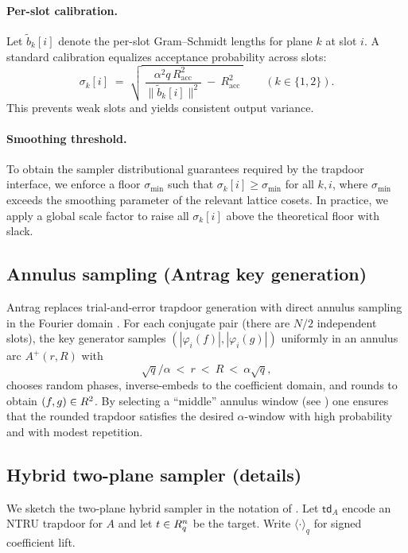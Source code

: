 \paragraph{Per-slot calibration.}
Let \(\widetilde{b}_k[i]\) denote the per-slot Gram--Schmidt lengths for plane \(k\) at slot \(i\). A standard
calibration equalizes acceptance probability across slots:
\[
  \sigma_k[i]
  \;=\;
  \sqrt{\ \frac{\alpha^2 q\,R_{\mathrm{acc}}^2}{\|\widetilde{b}_k[i]\|^2}\ -\ R_{\mathrm{acc}}^2\ }
  \qquad(k\in\{1,2\}).
\]
This prevents weak slots and yields consistent output variance.

\paragraph{Smoothing threshold.}
To obtain the sampler distributional guarantees required by the trapdoor interface, we enforce a floor \(\sigma_{\min}\) such that \(\sigma_k[i]\ge \sigma_{\min}\) for all
\(k,i\), where \(\sigma_{\min}\) exceeds the smoothing parameter of the relevant lattice cosets. In practice, we apply a
global scale factor to raise all \(\sigma_k[i]\) above the theoretical floor with slack.

\subsection{Annulus sampling (Antrag key generation)}
\label{subsec:antrag}
Antrag replaces trial-and-error trapdoor generation with direct annulus sampling in the Fourier domain
\cite{EPRINT:ENSTW23}. For each conjugate pair (there are \(N/2\) independent slots), the key generator samples
\((|\varphi_i(f)|,|\varphi_i(g)|)\) uniformly in an annulus arc \(A^+(r,R)\) with
\[
  \sqrt{q}/\alpha \ <\ r \ <\ R \ <\ \alpha\sqrt{q},
\]
chooses random phases, inverse-embeds to the coefficient domain, and rounds to obtain \((f,g)\in R^2\). By selecting a
``middle'' annulus window (see \cite{EPRINT:ENSTW23}) one ensures that the rounded trapdoor satisfies the desired
\(\alpha\)-window with high probability and with modest repetition.

\subsection{Hybrid two-plane sampler (details)}
\label{subsec:hybrid-sampler}
We sketch the two-plane hybrid sampler in the notation of \cite{EPRINT:ENSTW23}. Let \(\mathsf{td}_A\) encode an
NTRU trapdoor for \(A\) and let \(t\in R_q^n\) be the target. Write \(\langle\cdot\rangle_q\) for signed coefficient lift.


